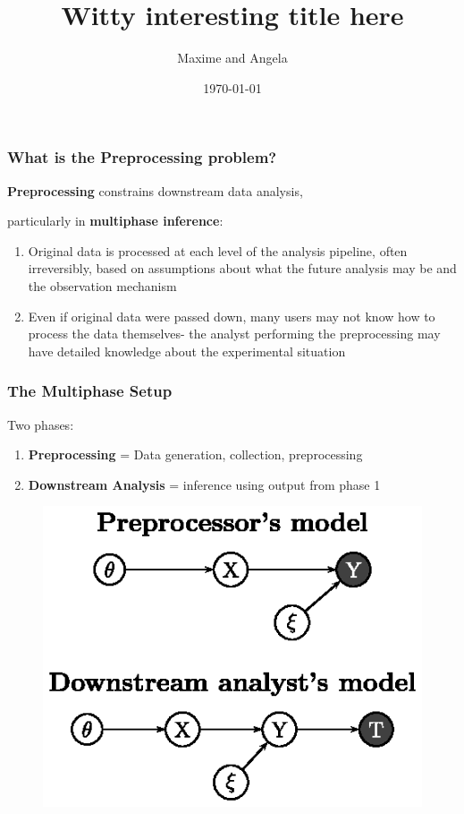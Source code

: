 \documentclass[10pt, compress]{beamer}
\title{Witty interesting title here}
\subtitle{}
\date{\today}
\author{Maxime and Angela}
\begin{document}
\maketitle

\begin{frame}[fragile]
    \frametitle{What is the Preprocessing problem?}
  
  \begin{center}
    \textbf{Preprocessing} constrains downstream data analysis, 
    
    particularly in \textbf{multiphase inference}:
  \end{center}
  
    \begin{enumerate}[<+->]
    \item Original data is processed at each level of the analysis pipeline, often irreversibly, based on assumptions about what the future analysis may be and the observation mechanism
    \vspace*{5mm}
    \item Even if original data were passed down, many users may not know how to process the data themselves- the analyst performing the preprocessing may have detailed knowledge about the experimental situation
  \end{enumerate}
  
\end{frame}

\begin{frame}[fragile]
    \frametitle{The Multiphase Setup}

    Two phases:
    \begin{enumerate}
    \item \textbf{Preprocessing} = Data generation, collection, preprocessing
    \item \textbf{Downstream Analysis} = inference using output from phase 1
    \end{enumerate}
    
    \begin{figure}[h!]
    \centering
    \includegraphics[width=.6\textwidth]{assets/two_phase_setting.ps}
    \end{figure}

\end{frame}
\end{document}
